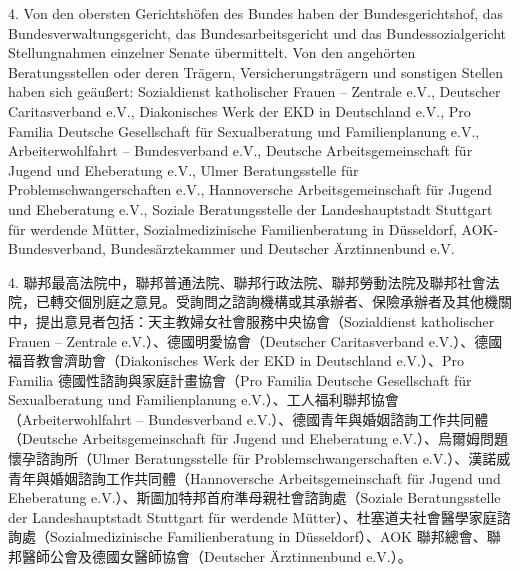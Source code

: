 \documentclass[12pt]{article}
\begin{document}
\begin{sourcepara}[title={原文理由 B.II.2--4} Rn 108]
4. Von den obersten Gerichtshöfen des Bundes haben der Bundesgerichtshof, das Bundesverwaltungsgericht, das Bundesarbeitsgericht und das Bundessozialgericht Stellungnahmen einzelner Senate übermittelt. Von den angehörten Beratungsstellen oder deren Trägern, Versicherungsträgern und sonstigen Stellen haben sich geäußert: Sozialdienst katholischer Frauen -- Zentrale e.V., Deutscher Caritasverband e.V., Diakonisches Werk der EKD in Deutschland e.V., Pro Familia Deutsche Gesellschaft für Sexualberatung und Familienplanung e.V., Arbeiterwohlfahrt -- Bundesverband e.V., Deutsche Arbeitsgemeinschaft für Jugend und Eheberatung e.V., Ulmer Beratungsstelle für Problemschwangerschaften e.V., Hannoversche Arbeitsgemeinschaft für Jugend und Eheberatung e.V., Soziale Beratungsstelle der Landeshauptstadt Stuttgart für werdende Mütter, Sozialmedizinische Familienberatung in Düsseldorf, AOK-Bundesverband, Bundesärztekammer und Deutscher Ärztinnenbund e.V.
\end{sourcepara}
\begin{transpara}
4. 聯邦最高法院中，聯邦普通法院、聯邦行政法院、聯邦勞動法院及聯邦社會法院，已轉交個別庭之意見。受詢問之諮詢機構或其承辦者、保險承辦者及其他機關中，提出意見者包括：天主教婦女社會服務中央協會（Sozialdienst katholischer Frauen -- Zentrale e.V.）、德國明愛協會（Deutscher Caritasverband e.V.）、德國福音教會濟助會（Diakonisches Werk der EKD in Deutschland e.V.）、Pro Familia 德國性諮詢與家庭計畫協會（Pro Familia Deutsche Gesellschaft für Sexualberatung und Familienplanung e.V.）、工人福利聯邦協會（Arbeiterwohlfahrt -- Bundesverband e.V.）、德國青年與婚姻諮詢工作共同體（Deutsche Arbeitsgemeinschaft für Jugend und Eheberatung e.V.）、烏爾姆問題懷孕諮詢所（Ulmer Beratungsstelle für Problemschwangerschaften e.V.）、漢諾威青年與婚姻諮詢工作共同體（Hannoversche Arbeitsgemeinschaft für Jugend und Eheberatung e.V.）、斯圖加特邦首府準母親社會諮詢處（Soziale Beratungsstelle der Landeshauptstadt Stuttgart für werdende Mütter）、杜塞道夫社會醫學家庭諮詢處（Sozialmedizinische Familienberatung in Düsseldorf）、AOK 聯邦總會、聯邦醫師公會及德國女醫師協會（Deutscher Ärztinnenbund e.V.）。
\end{transpara}


\end{document}
